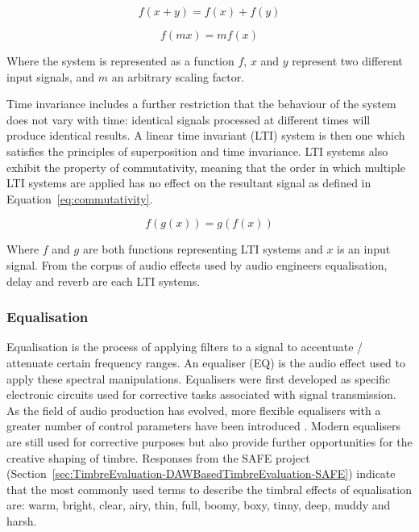 		\begin{equation} f(x + y) = f(x) + f(y) \label{eq:additivity} \end{equation}

		\begin{equation} f(mx) = mf(x) \label{eq:homogeneity} \end{equation}

		Where the system is represented as a function $f$, $x$ and $y$ represent two different input signals, and
		$m$ an arbitrary scaling factor.

		Time invariance includes a further restriction that the behaviour of the system does not vary with time:
		identical signals processed at different times will produce identical results. A linear time invariant
		(LTI) system is then one which satisfies the principles of superposition and time invariance. LTI systems
		also exhibit the property of commutativity, meaning that the order in which multiple LTI systems are
		applied has no effect on the resultant signal as defined in Equation~\ref{eq:commutativity}.

		\begin{equation} f(g(x)) = g(f(x)) \label{eq:commutativity} \end{equation}

		Where $f$ and $g$ are both functions representing LTI systems and $x$ is an input signal. From the corpus
		of audio effects used by audio engineers equalisation, delay and reverb are each LTI systems.

		\subsubsection*{Equalisation}
			Equalisation is the process of applying filters to a signal to accentuate / attenuate certain
			frequency ranges. An equaliser (EQ) is the audio effect used to apply these spectral manipulations.
			Equalisers were first developed as specific electronic circuits used for corrective tasks
			associated with signal transmission. As the field of audio production has evolved, more flexible
			equalisers with a greater number of control parameters have been introduced
			\citep{gottlieb2007shaping}. Modern equalisers are still used for corrective purposes but also
			provide further opportunities for the creative shaping of timbre. Responses from the SAFE project
			(Section~\ref{sec:TimbreEvaluation-DAWBasedTimbreEvaluation-SAFE}) indicate that the most commonly
			used terms to describe the timbral effects of equalisation are: warm, bright, clear, airy, thin,
			full, boomy, boxy, tinny, deep, muddy and harsh.

